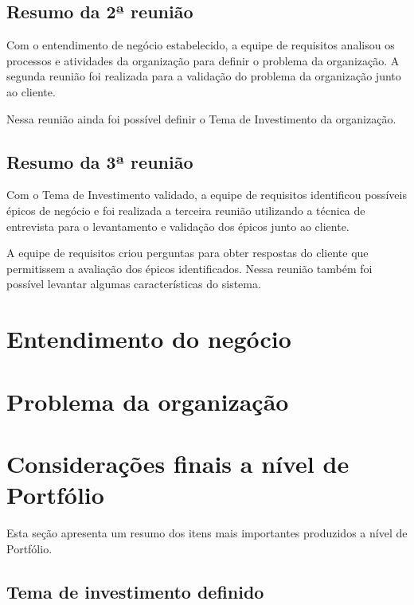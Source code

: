     \subsection{Resumo da 2ª reunião}
    
      Com o entendimento de negócio estabelecido, a equipe de requisitos analisou os processos e atividades da 
      organização para definir o problema da organização. A segunda reunião foi realizada para a validação do problema 
      da organização junto ao cliente.
      
      Nessa reunião ainda foi possível definir o Tema de Investimento da organização.
    
    \subsection{Resumo da 3ª reunião}
    
      Com o Tema de Investimento validado, a equipe de requisitos identificou possíveis épicos de negócio e foi realizada a terceira
      reunião utilizando a técnica de entrevista para o levantamento e validação dos épicos junto ao cliente.
      
      A equipe de requisitos criou perguntas para obter respostas do cliente que permitissem a avaliação dos épicos identificados.
      Nessa reunião também foi possível levantar algumas características do sistema.
    
  \section{Entendimento do negócio}
  
    
    
  \section{Problema da organização}
    
    
  
  \section{Considerações finais a nível de Portfólio}
    
    Esta seção apresenta um resumo dos itens mais importantes produzidos a nível de Portfólio.
    
    \subsection{Tema de investimento definido}
      
